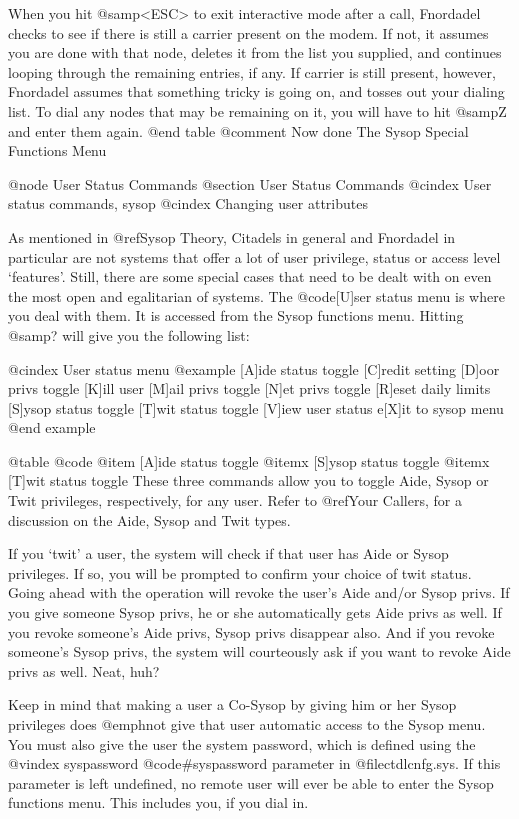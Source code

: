 When you hit @samp{<ESC>} to exit interactive mode after a call,
Fnordadel checks to see if there is still a carrier present on the
modem.  If not, it assumes you are done with that node, deletes it
from the list you supplied, and continues looping through the remaining
entries, if any.  If carrier is still present, however,
Fnordadel assumes that something tricky is going on, and tosses
out your dialing list.  To dial any nodes that may be remaining on
it, you will have to hit @samp{Z} and enter them again.
@end table
@comment Now done The Sysop Special Functions Menu

@node User Status Commands
@section User Status Commands
@cindex User status commands, sysop
@cindex Changing user attributes

As mentioned in @ref{Sysop Theory}, Citadels in general and Fnordadel in
particular are not systems that offer a lot of user privilege, status or
access level `features'.  Still, there are some special cases that need
to be dealt with on even the most open and egalitarian of systems.  The
@code{[U]ser status} menu is where you deal with them.  It is accessed from
the Sysop functions menu.  Hitting @samp{?} will give you the following list:

@cindex User status menu
@example
[A]ide status toggle
[C]redit setting
[D]oor privs toggle
[K]ill user
[M]ail privs toggle
[N]et privs toggle
[R]eset daily limits
[S]ysop status toggle
[T]wit status toggle
[V]iew user status
e[X]it to sysop menu
@end example

@table @code
@item [A]ide status toggle
@itemx [S]ysop status toggle
@itemx [T]wit status toggle
These three commands allow you to toggle Aide,
Sysop or Twit privileges, respectively, for any user.  Refer to
@ref{Your Callers}, for a discussion on the Aide, Sysop
and Twit types.

If you `twit' a user, the system will
check if that user has Aide or Sysop privileges.  If so, you will
be prompted to confirm your choice of twit status.  Going ahead
with the operation will revoke the user's Aide and/or Sysop
privs.  If you give someone Sysop privs, he or she automatically
gets Aide privs as well.  If you revoke someone's Aide privs,
Sysop privs disappear also.  And if you revoke someone's Sysop privs,
the system will courteously ask if you want to revoke Aide
privs as well.  Neat, huh?

Keep in mind that making a user a Co-Sysop by giving him or her Sysop
privileges does @emph{not} give that user automatic access to the
Sysop menu.  You must also give the user the system password, which
is defined using the
@vindex syspassword
@code{#syspassword} parameter in @file{ctdlcnfg.sys}.
If this parameter is left undefined, no remote user will ever be able to
enter the Sysop functions menu.  This includes you, if you dial in.


